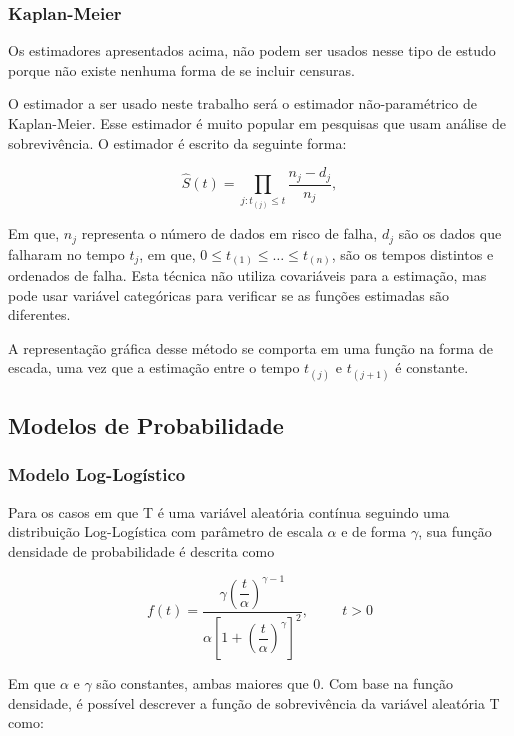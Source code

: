 \documentclass[a4paper,12pt]{article}
\begin{document}
\subsubsection{Kaplan-Meier}

Os estimadores apresentados acima, não podem ser usados nesse tipo de estudo porque não existe nenhuma forma de se incluir censuras.

O estimador a ser usado neste trabalho será o estimador não-paramétrico de Kaplan-Meier. Esse estimador é muito popular em pesquisas que usam análise de sobrevivência. O estimador é escrito da seguinte forma:

$$ \hat{S}(t) = \prod_{j:t_{(j)}\le t} \dfrac{n_j - d_j}{n_j},$$

Em que, $n_j$ representa o número de dados em risco de falha, $d_j$ são os dados que falharam no tempo $t_j$, em que, $0 \le t_{(1)} \le \hdots \le t_{(n)}$, são os tempos distintos e ordenados de falha. Esta técnica não utiliza covariáveis para a estimação, mas pode usar variável categóricas para verificar se as funções estimadas são diferentes. 

A representação gráfica desse método se comporta em uma função na forma de escada, uma vez que a estimação entre o tempo $t_{(j)}$ e $t_{(j+1)}$ é constante.


\subsection{Modelos de Probabilidade}

\subsubsection{Modelo Log-Logístico}

Para os casos em que T é uma variável aleatória contínua seguindo uma distribuição Log-Logística com parâmetro de escala $\alpha$ e de forma $\gamma$, sua função densidade de probabilidade é descrita como

\begin{equation} \label{eq:densLL}
  f(t) = \dfrac{\gamma\left(\dfrac{t}{\alpha}\right)^{\gamma - 1}}{\alpha\left[1+\left(\dfrac{t}{\alpha}\right)^{\gamma}\right]^2}, \hspace{1cm} t > 0
\end{equation}

Em que $\alpha$ e $\gamma$ são constantes, ambas maiores que 0. Com base na função densidade, é possível descrever a função de sobrevivência da variável aleatória T como:
\end{document}
